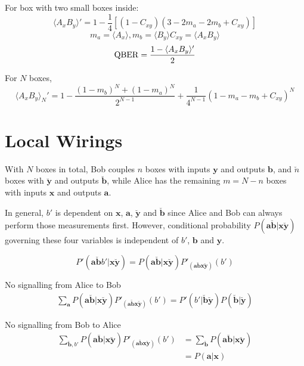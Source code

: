 \documentclass[10pt, a4paper]{article}
\newcommand{\?}{\mathrel{?}} %
\newcommand{\cvec}[1]{\boldsymbol{\mathbf{#1}}}    %
\numberwithin{equation}{section} %
\theoremstyle{definition}
\theoremstyle{plain}
\theoremstyle{plain}
\begin{document}
  For box with two small boxes inside:
  \[ \langle A_x B_y \rangle' = 1 - \frac{1}{4} \left[ (1 - C_{xy}) (3 - 2m_a - 2 m_b + C_{xy} ) \right] \]
      \[ m_a = \langle A_x \rangle, m_b = \langle B_y \rangle C_{xy} = \langle A_x B_y \rangle \]
      \[ {\rm QBER} = \frac{1 - \langle A_x B_y \rangle'}{2} \]

      For \(N\) boxes,
    \[ \langle A_x B_y \rangle_{N}' = 1 - \frac{{(1-m_b)}^N + {(1-m_a)}^N}{2^{N-1}} + \frac{1}{4^{N-1}} {(1-m_a-m_b+C_{xy})}^{N} \]

    \section{Local Wirings}

    With \(N\) boxes in total, Bob couples \(n\) boxes with inputs \(\cvec{y}\) and outputs \(\cvec{b}\), and \(\breve{n}\) boxes with \(\breve{\cvec{y}}\) and outputs \(\breve{\cvec{b}}\), while Alice has the remaining \(m = N - n\) boxes with inputs \(\cvec{x}\) and outputs \(\cvec{a}\).

    In general, \(b'\) is dependent on \(\cvec{x}\), \(\cvec{a}\), \(\breve{\cvec{y}}\) and \(\breve{\cvec{b}}\) since Alice and Bob can always perform those measurements first. However, conditional probability \(P(\cvec{a}\breve{\cvec{b}}|\cvec{x}\breve{\cvec{y}})\) governing these four variables is independent of \(b'\), \(\cvec{b}\) and \(\cvec{y}\).

    \[ P'(\cvec{a}\breve{\cvec{b}}b'|\cvec{x}\breve{\cvec{y}}) = P(\cvec{a}\breve{\cvec{b}}|\cvec{x}\breve{\cvec{y}}) P'_{(\cvec{a}\breve{\cvec{b}}\cvec{x}\breve{\cvec{y}})}(b')  \]

    No signalling from Alice to Bob
    \begin{align}
      \sum_{\cvec{a}} P(\cvec{a}\breve{\cvec{b}}|\cvec{x}\breve{\cvec{y}}) P'_{(\cvec{a}\breve{\cvec{b}}\cvec{x}\breve{\cvec{y}})}(b') = P'(b'|\breve{\cvec{b}}\breve{\cvec{y}}) P(\breve{\cvec{b}}|\breve{\cvec{y}})
    \end{align}

    No signalling from Bob to Alice
    \begin{align}
      \sum_{\cvec{\breve{b}}, b'} P(\cvec{a}\breve{\cvec{b}}|\cvec{x}\breve{\cvec{y}}) P'_{(\cvec{a}\breve{\cvec{b}}\cvec{x}\breve{\cvec{y}})}(b') &= \sum_{\cvec{\breve{b}}} P(\cvec{a}\breve{\cvec{b}}|\cvec{x}\breve{\cvec{y}}) \\
                                                                                                                                                     &= P(\cvec{a}|\cvec{x})
    \end{align}
\end{document}
